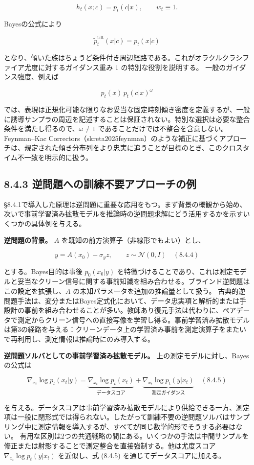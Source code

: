 \[
h_t(x;c)=p_t(c|x),\qquad w_t\equiv 1.
\]


Bayesの公式により

\[
\tilde{p}_t^{\mathrm{tilt}}(x|c)=p_t(x|c)
\]


となり、傾いた族はちょうど条件付き周辺経路である。これがオラクルクラシファイア尤度に対するガイダンス重み $1$ の特別な役割を説明する。
一般のガイダンス強度、例えば

\[
p_t(x)\,p_t(c|x)^\omega
\]


では、表現は正規化可能な限りなお妥当な固定時刻傾き密度を定義するが、一般に誘導サンプラの周辺を記述することは保証されない。特別な選択は必要な整合条件を満たし得るので、$\omega\neq 1$ であることだけでは不整合を含意しない。
Feynman–Kac Correctors（skreta2025feynman）のような補正に基づくアプローチは、規定された傾き分布列をより忠実に追うことが目標のとき、このクロスタイム不一致を明示的に扱う。

\subsection*{8.4.3 逆問題への訓練不要アプローチの例}


§8.4.1で導入した原理は逆問題に重要な応用をもつ。まず背景の概観から始め、次いで事前学習済み拡散モデルを推論時の逆問題求解にどう活用するかを示すいくつかの具体例を与える。

\textbf{逆問題の背景。} $A$ を既知の前方演算子（非線形でもよい）とし、

\[
y=A(x_0)+\sigma_y z,\qquad z\sim\mathcal{N}(0,I) \quad (8.4.4)
\]


とする。Bayes目的は事後 $p_0(x_0|y)$ を特徴づけることであり、これは測定モデルと妥当なクリーン信号に関する事前知識を組み合わせる。ブラインド逆問題はこの設定を拡張し、$A$ の未知パラメータを追加の推論量として扱う。
古典的逆問題手法は、変分またはBayes定式化において、データ忠実項と解析的または手設計の事前を組み合わせることが多い。教師あり復元手法は代わりに、ペアデータで測定からクリーン信号への直接写像を学習し得る。事前学習済み拡散モデルは第3の経路を与える：クリーンデータ上の学習済み事前を測定演算子をまたいで再利用し、測定情報は推論時にのみ導入する。

\textbf{逆問題ソルバとしての事前学習済み拡散モデル。} 上の測定モデルに対し、Bayesの公式は

\[
\nabla_{x_t}\log p_t(x_t|y)=\underbrace{\nabla_{x_t}\log p_t(x_t)}_{\text{データスコア}}+\underbrace{\nabla_{x_t}\log p_t(y|x_t)}_{\text{測定ガイダンス}} \quad (8.4.5)
\]


を与える。データスコアは事前学習済み拡散モデルにより供給できる一方、測定項は一般に閉形式では得られない。したがって訓練不要の逆問題ソルバはサンプリング中に測定情報を導入するが、すべてが同じ数学的形でそうする必要はない。
有用な区別は2つの共通戦略の間にある。いくつかの手法は中間サンプルを修正または射影することで測定整合を直接強制する。他は尤度スコア $\nabla_{x_t}\log p_t(y|x_t)$ を近似し、式 (8.4.5) を通じてデータスコアに加える。

